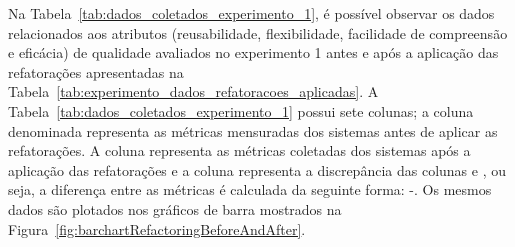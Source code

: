 Na Tabela~\ref{tab:dados_coletados_experimento_1}, é possível observar os dados relacionados aos atributos (reusabilidade, flexibilidade, facilidade de compreensão e eficácia) de qualidade avaliados no experimento 1 antes e após a aplicação das refatorações apresentadas na Tabela~\ref{tab:experimento_dados_refatoracoes_aplicadas}. A Tabela~\ref{tab:dados_coletados_experimento_1} possui sete colunas; a coluna denominada  representa as métricas mensuradas dos sistemas antes de aplicar as refatorações. A coluna  representa as métricas coletadas dos sistemas após a aplicação das refatorações e a coluna  representa a discrepância das colunas  e , ou seja, a diferença entre as métricas é calculada da seguinte forma: -. Os mesmos dados são plotados nos gráficos de barra mostrados na Figura~\ref{fig:barchartRefactoringBeforeAndAfter}. 


